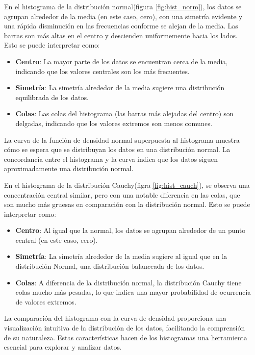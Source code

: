 \documentclass[../Main.tex]{subfiles}
\begin{document}
En el histograma de la distribución normal(figura \ref{fig:hist_norm}), los datos se agrupan alrededor de la media (en este caso, cero), con una simetría evidente y una rápida disminución en las frecuencias conforme se alejan de la media. Las barras son más altas en el centro y descienden uniformemente hacia los lados. Esto se puede interpretar como:
\begin{itemize}
    \item \textbf{Centro}: La mayor parte de los datos se encuentran cerca de la media, indicando que los valores centrales son los más frecuentes.
    \item \textbf{Simetría}: La simetría alrededor de la media sugiere una distribución equilibrada de los datos.
    \item \textbf{Colas}: Las colas del histograma (las barras más alejadas del centro) son delgadas, indicando que los valores extremos son menos comunes.
\end{itemize}
 La curva de la función de densidad normal superpuesta al histograma muestra cómo se espera que se distribuyan los datos en una distribución normal. La concordancia entre el histograma y la curva indica que los datos siguen aproximadamente una distribución normal.

En el histograma de la distribución Cauchy(figra \ref{fig:hist_cauch}), se observa una concentración central similar, pero con una notable diferencia en las colas, que son mucho más gruesas en comparación con la distribución normal. Esto se puede interpretar como:
\begin{itemize}
    \item \textbf{Centro}: Al igual que la normal, los datos se agrupan alrededor de un punto central (en este caso, cero).
       \item \textbf{Simetría}: La simetría alrededor de la media sugiere al igual que en la distribución Normal, una distribución balanceada de los datos.
    \item \textbf{Colas}: A diferencia de la distribución normal, la distribución Cauchy tiene colas mucho más pesadas, lo que indica una mayor probabilidad de ocurrencia de valores extremos.
\end{itemize}

 La comparación del histograma con la curva de densidad proporciona una visualización intuitiva de la distribución de los datos, facilitando la comprensión de su naturaleza. Estas características hacen de los histogramas una herramienta esencial para explorar y analizar datos.
\end{document}
